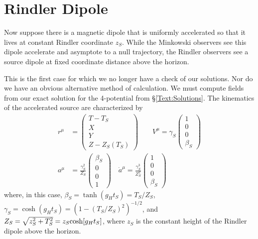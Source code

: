 \section{Rindler Dipole}
\label{Stationary Rindler Dipole}
Now suppose there is a magnetic dipole that is uniformly accelerated
so that it lives at constant Rindler coordinate $z_S$. While the
Minkowski observers see this dipole accelerate and asymptote to a
null trajectory, the Rindler observers
see a source dipole at fixed coordinate distance above the horizon.

This is the first case for which we no longer have a check of our
solutions. Nor do we have an obvious alternative method of
calculation.
We must
compute fields from our exact solution for the 4-potential from \S \ref{Text:Solutions}. The kinematics
of the accelerated source are characterized by 
\begin{align}
r^{\mu} &=
\begin{pmatrix}
T-T_{S}\nonumber \\
X \nonumber \\
Y \nonumber \\
Z- Z_S(T_S)
\end{pmatrix}  \qquad
V^{\mu} = \gamma_S
\begin{pmatrix}
1\nonumber \\
0 \nonumber \\
0 \nonumber \\
\beta_S
\end{pmatrix} \nonumber \\
a^{\mu} &=  \frac{\gamma^2_S}{Z_S }
\begin{pmatrix}
\beta_S \nonumber \\
0 \nonumber \\
0 \nonumber \\
1
\end{pmatrix} \quad 
\dot{a}^{\mu} = \frac{\gamma^3_S}{Z^2_S }
\begin{pmatrix}
1 \nonumber \\
0 \nonumber \\
0 \nonumber \\
\beta_S
\end{pmatrix} 
\end{align}
where, in this case, $\beta_S=\tanh(g_Ht_S)=T_S/Z_S$, $\gamma_S=\cosh(g_Ht_S)=(1-(T_S/Z_S)^2)^{-1/2}$, and 
$Z_S= \sqrt{z^2_S + T^2_S}=z_S \hbox{cosh}[g_H t_S]$, where $z_S$ is the constant height of the Rindler dipole above the horizon.



